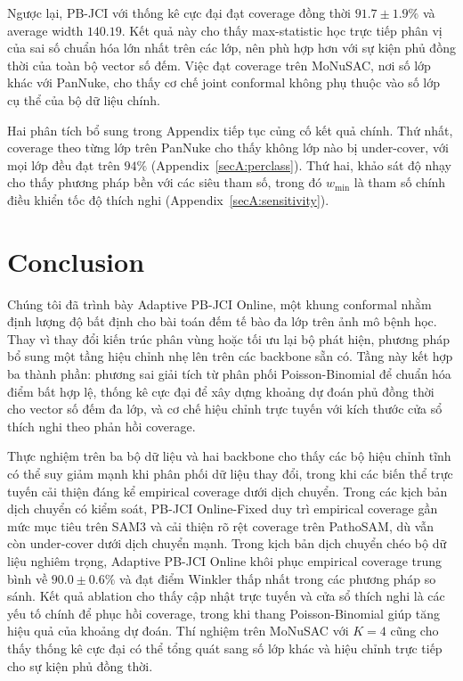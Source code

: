 \documentclass[pdflatex,sn-mathphys-num]{sn-jnl}
\begin{document}
Ngược lại, PB-JCI với thống kê cực đại đạt coverage đồng thời
$91.7\pm1.9\%$ và average width $140.19$. Kết quả này cho thấy max-statistic học trực
tiếp phân vị của sai số chuẩn hóa lớn nhất trên các lớp, nên phù hợp hơn với sự kiện
phủ đồng thời của toàn bộ vector số đếm. Việc đạt coverage trên MoNuSAC, nơi số lớp
khác với PanNuke, cho thấy cơ chế joint conformal không phụ thuộc vào số lớp cụ thể
của bộ dữ liệu chính.

Hai phân tích bổ sung trong Appendix tiếp tục củng cố kết quả chính. Thứ nhất, coverage
theo từng lớp trên PanNuke cho thấy không lớp nào bị under-cover, với mọi lớp đều đạt
trên \(94\%\) (Appendix~\ref{secA:perclass}). Thứ hai, khảo sát độ nhạy cho thấy phương
pháp bền với các siêu tham số, trong đó \(w_{\min}\) là tham số chính điều khiển tốc độ
thích nghi (Appendix~\ref{secA:sensitivity}).

\section{Conclusion}\label{sec:conclusion}

Chúng tôi đã trình bày Adaptive PB-JCI Online, một khung conformal nhằm định lượng độ
bất định cho bài toán đếm tế bào đa lớp trên ảnh mô bệnh học. Thay vì thay đổi kiến
trúc phân vùng hoặc tối ưu lại bộ phát hiện, phương pháp bổ sung một tầng hiệu chỉnh
nhẹ lên trên các backbone sẵn có. Tầng này kết hợp ba thành phần: phương sai giải tích
từ phân phối Poisson-Binomial để chuẩn hóa điểm bất hợp lệ, thống kê cực đại để xây
dựng khoảng dự đoán phủ đồng thời cho vector số đếm đa lớp, và cơ chế hiệu chỉnh trực
tuyến với kích thước cửa sổ thích nghi theo phản hồi coverage.

Thực nghiệm trên ba bộ dữ liệu và hai backbone cho thấy các bộ hiệu chỉnh tĩnh có thể
suy giảm mạnh khi phân phối dữ liệu thay đổi, trong khi các biến thể trực tuyến cải
thiện đáng kể empirical coverage dưới dịch chuyển. Trong các kịch bản dịch chuyển có
kiểm soát, PB-JCI Online-Fixed duy trì empirical coverage gần mức mục tiêu trên SAM3 và
cải thiện rõ rệt coverage trên PathoSAM, dù vẫn còn under-cover dưới dịch chuyển mạnh. Trong kịch bản
dịch chuyển chéo bộ dữ liệu nghiêm trọng, Adaptive PB-JCI Online khôi phục empirical
coverage trung bình về \(90.0\pm0.6\%\) và đạt điểm Winkler thấp nhất trong các
phương pháp so sánh. Kết quả ablation cho thấy cập nhật trực tuyến và cửa sổ thích
nghi là các yếu tố chính để phục hồi coverage, trong khi thang Poisson-Binomial giúp
tăng hiệu quả của khoảng dự đoán. Thí nghiệm trên MoNuSAC với \(K=4\) cũng cho thấy
thống kê cực đại có thể tổng quát sang số lớp khác và hiệu chỉnh trực tiếp cho sự kiện
phủ đồng thời.
\end{document}
